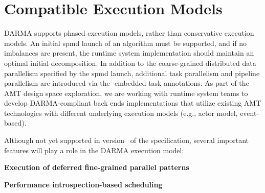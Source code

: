 
\section{Compatible Execution Models}
\label{sec:execmodel}
\gls{DARMA} supports \gls{phased execution} models, rather than \gls{conservative
execution} models.  
An initial \gls{spmd} launch of an algorithm must be supported, and if
no imbalances are present, the \gls{runtime system} implementation should
maintain an optimal initial decomposition. In addition to the coarse-grained distributed
\gls{data parallelism} specified by the \gls{spmd} launch, additional \gls{task
parallelism} and \gls{pipeline parallelism} are introduced via the \CC-embedded task annotations.
As part of the \gls{AMT} design space exploration, we are working with
\gls{runtime system} teams to develop \gls{DARMA}-compliant \glspl{back end}
implementations that utilize existing \gls{AMT} technologies with different
underlying \glspl{execution model} (e.g., \gls{actor model}, \gls{event-based}).  


Although not yet supported in version \specVersion\ of the specification, several
important features will play a role in the DARMA \gls{execution model}:

\begin{compactdesc}
\item{\bf Execution of deferred fine-grained parallel patterns}
\item{\bf Performance introspection-based scheduling}
\end{compactdesc}

